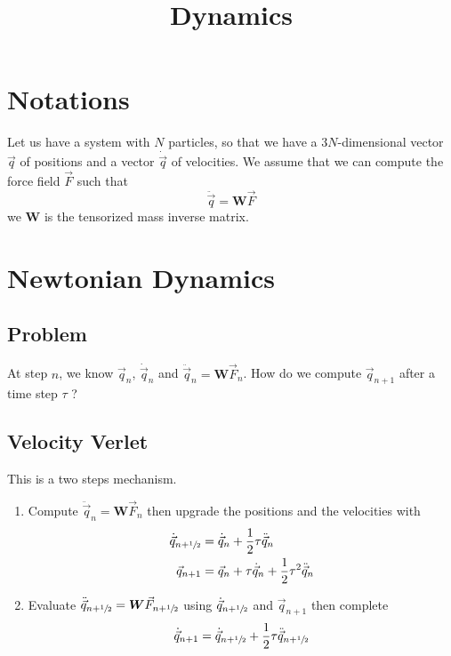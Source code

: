 \documentclass[aps,twocolumn]{revtex4}
\newcommand{\mymat}[1]{\boldsymbol{#1}}
\newcommand{\half}{\sfrac{1}{2}}
\begin{document}
\title{Dynamics}

\section{Notations}
Let us have a system with $N$ particles, so that we have a $3N$-dimensional
vector $\vec{q}$ of positions and a vector $\dot{\vec{q}}$ of velocities.
We assume that we can compute the force field $\vec{F}$ such that
\begin{equation}
	\ddot{\vec{q}} = \mymat{W} \vec{F}
\end{equation}
we $\mymat{W}$ is the tensorized mass inverse matrix.

\section{Newtonian Dynamics}

\subsection{Problem}
At step $n$, we know $\vec{q}_n$, $\dot{\vec{q}}_n$ and $\ddot{\vec{q}}_n = \mymat{W} \vec{F}_n$.
How do we compute $\vec{q}_{n+1}$ after a time step $\tau$ ?

\subsection{Velocity Verlet}
This is a two steps mechanism.
\begin{enumerate}
	\item
	Compute $\ddot{\vec{q}}_n = \mymat{W} \vec{F}_n$ then 
	upgrade the positions and the velocities with
	\begin{align}
	\dot{\vec{q}}_{n+\half} & = \dot{\vec{q}}_{n} + \dfrac{1}{2} \tau \ddot{\vec{q}}_n \\
	\vec{q}_{n+1}           & = \vec{q}_{n}       + \tau \dot{\vec{q}}_{n} + \dfrac{1}{2}{\tau^2} \ddot{\vec{q}}_n
\end{align}

	\item 
	Evaluate $\ddot{\vec{q}}_{n+\half} = \mymat{W} \vec{F}_{n+\half}$  using $\dot{\vec{q}}_{n+\half}$ and $\vec{q}_{n+1}$ 
	then complete
	\begin{equation}
		\dot{\vec{q}}_{n+1} = \dot{\vec{q}}_{n+\half} + \dfrac{1}{2} \tau \ddot{\vec{q}}_{n+\half}
	\end{equation}

\end{enumerate}
\end{document}
